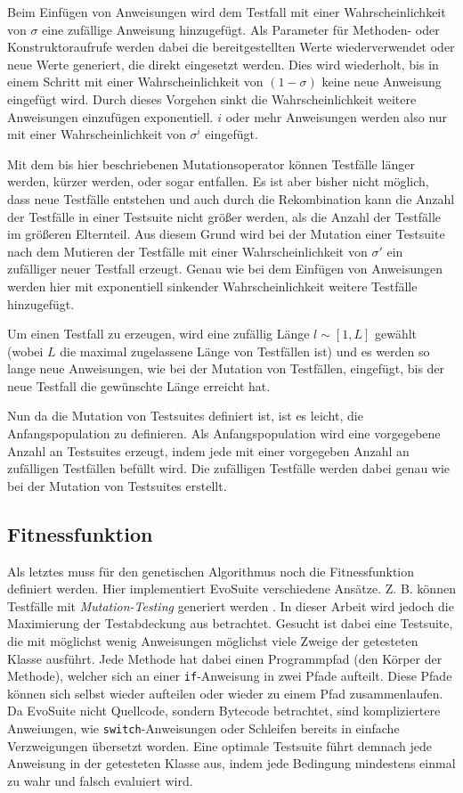 \documentclass[a4paper,11pt]{article}
\begin{document}
Beim Einfügen von Anweisungen wird dem Testfall mit einer Wahrscheinlichkeit von $\sigma$ eine zufällige Anweisung hinzugefügt.
Als Parameter für Methoden- oder Konstruktoraufrufe werden dabei die bereitgestellten Werte wiederverwendet oder neue Werte generiert, die direkt eingesetzt werden.
Dies wird wiederholt, bis in einem Schritt mit einer Wahrscheinlichkeit von $(1 - \sigma)$ keine neue Anweisung eingefügt wird.
Durch dieses Vorgehen sinkt die Wahrscheinlichkeit weitere Anweisungen einzufügen exponentiell.
$i$ oder mehr Anweisungen werden also nur mit einer Wahrscheinlichkeit von $\sigma^i$ eingefügt.

Mit dem bis hier beschriebenen Mutationsoperator können Testfälle länger werden, kürzer werden, oder sogar entfallen.
Es ist aber bisher nicht möglich, dass neue Testfälle entstehen und auch durch die Rekombination kann die Anzahl der Testfälle in einer Testsuite nicht größer werden, als die Anzahl der Testfälle im größeren Elternteil.
Aus diesem Grund wird bei der Mutation einer Testsuite nach dem Mutieren der Testfälle mit einer Wahrscheinlichkeit von $\sigma'$ ein zufälliger neuer Testfall erzeugt.
Genau wie bei dem Einfügen von Anweisungen werden hier mit exponentiell sinkender Wahrscheinlichkeit weitere Testfälle hinzugefügt.

Um einen Testfall zu erzeugen, wird eine zufällig Länge $l \sim [1, L]$ gewählt (wobei $L$ die maximal zugelassene Länge von Testfällen ist) und es werden so lange neue Anweisungen, wie bei der Mutation von Testfällen, eingefügt, bis der neue Testfall die gewünschte Länge erreicht hat.

Nun da die Mutation von Testsuites definiert ist, ist es leicht, die Anfangspopulation zu definieren.
Als Anfangspopulation wird eine vorgegebene Anzahl an Testsuites erzeugt, indem jede mit einer vorgegeben Anzahl an zufälligen Testfällen befüllt wird.
Die zufälligen Testfälle werden dabei genau wie bei der Mutation von Testsuites erstellt.

\subsection{Fitnessfunktion}

Als letztes muss für den genetischen Algorithmus noch die Fitnessfunktion definiert werden.
Hier implementiert EvoSuite verschiedene Ansätze.
Z. B. können Testfälle mit \textit{Mutation-Testing} generiert werden \cite{emse14_mutation}.
In dieser Arbeit wird jedoch die Maximierung der Testabdeckung aus \cite{TSE12_EvoSuite} betrachtet.
Gesucht ist dabei eine Testsuite, die mit möglichst wenig Anweisungen möglichst viele Zweige der getesteten Klasse ausführt.
Jede Methode hat dabei einen Programmpfad (den Körper der Methode), welcher sich an einer \lstinline{if}-Anweisung in zwei Pfade aufteilt.
Diese Pfade können sich selbst wieder aufteilen oder wieder zu einem Pfad zusammenlaufen.
Da EvoSuite nicht Quellcode, sondern Bytecode betrachtet, sind kompliziertere Anweiungen, wie \lstinline{switch}-Anweisungen oder Schleifen bereits in einfache Verzweigungen übersetzt worden.
Eine optimale Testsuite führt demnach jede Anweisung in der getesteten Klasse aus, indem jede Bedingung mindestens einmal zu wahr und falsch evaluiert wird.
\end{document}

